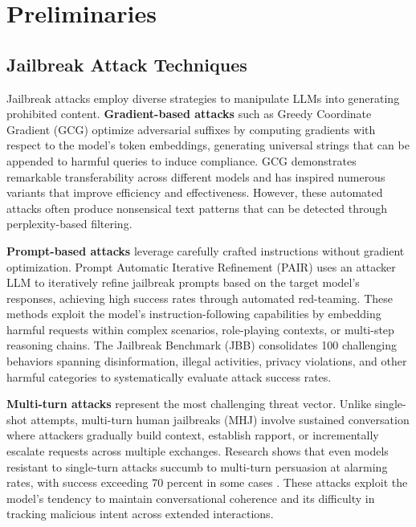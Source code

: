 \section{Preliminaries}

\subsection{Jailbreak Attack Techniques}

Jailbreak attacks employ diverse strategies to manipulate LLMs into generating prohibited content. \textbf{Gradient-based attacks} such as Greedy Coordinate Gradient (GCG) \cite{zou2023universal} optimize adversarial suffixes by computing gradients with respect to the model's token embeddings, generating universal strings that can be appended to harmful queries to induce compliance. GCG demonstrates remarkable transferability across different models and has inspired numerous variants that improve efficiency and effectiveness. However, these automated attacks often produce nonsensical text patterns that can be detected through perplexity-based filtering.

\textbf{Prompt-based attacks} leverage carefully crafted instructions without gradient optimization. Prompt Automatic Iterative Refinement (PAIR) \cite{chao2023jailbreaking} uses an attacker LLM to iteratively refine jailbreak prompts based on the target model's responses, achieving high success rates through automated red-teaming. These methods exploit the model's instruction-following capabilities by embedding harmful requests within complex scenarios, role-playing contexts, or multi-step reasoning chains. The Jailbreak Benchmark (JBB) \cite{chao2024jailbreakbench} consolidates 100 challenging behaviors spanning disinformation, illegal activities, privacy violations, and other harmful categories to systematically evaluate attack success rates.

\textbf{Multi-turn attacks} represent the most challenging threat vector. Unlike single-shot attempts, multi-turn human jailbreaks (MHJ) \cite{mhj} involve sustained conversation where attackers gradually build context, establish rapport, or incrementally escalate requests across multiple exchanges. Research shows that even models resistant to single-turn attacks succumb to multi-turn persuasion at alarming rates, with success exceeding 70 percent in some cases \cite{m2s}. These attacks exploit the model's tendency to maintain conversational coherence and its difficulty in tracking malicious intent across extended interactions.

